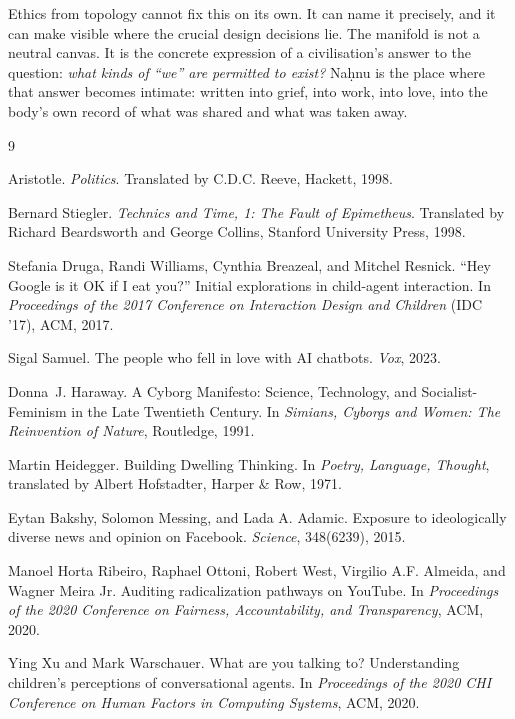 \documentclass[12pt,a4paper]{article}
\begin{document}
Ethics from topology cannot fix this on its own. It can name it precisely, and it can make visible where the crucial design decisions lie. The manifold is not a neutral canvas. It is the concrete expression of a civilisation's answer to the question: \emph{what kinds of ``we'' are permitted to exist?} Na\d{h}nu is the place where that answer becomes intimate: written into grief, into work, into love, into the body's own record of what was shared and what was taken away.


\begin{thebibliography}{9}

Aristotle.
\newblock \emph{Politics}.
\newblock Translated by C.D.C. Reeve, Hackett, 1998.

Bernard Stiegler.
\newblock \emph{Technics and Time, 1: The Fault of Epimetheus}.
\newblock Translated by Richard Beardsworth and George Collins, Stanford University Press, 1998.

Stefania Druga, Randi Williams, Cynthia Breazeal, and Mitchel Resnick.
\newblock ``Hey Google is it OK if I eat you?'' Initial explorations in child-agent interaction.
\newblock In \emph{Proceedings of the 2017 Conference on Interaction Design and Children} (IDC '17), ACM, 2017.

Sigal Samuel.
\newblock The people who fell in love with AI chatbots.
\newblock \emph{Vox}, 2023.

Donna~J. Haraway.
\newblock A Cyborg Manifesto: Science, Technology, and Socialist-Feminism in the Late Twentieth Century.
\newblock In \emph{Simians, Cyborgs and Women: The Reinvention of Nature}, Routledge, 1991.

Martin Heidegger.
\newblock Building Dwelling Thinking.
\newblock In \emph{Poetry, Language, Thought}, translated by Albert Hofstadter, Harper \& Row, 1971.

Eytan Bakshy, Solomon Messing, and Lada A. Adamic.
\newblock Exposure to ideologically diverse news and opinion on Facebook.
\newblock \emph{Science}, 348(6239), 2015.

Manoel Horta Ribeiro, Raphael Ottoni, Robert West, Virgilio A.F. Almeida, and Wagner Meira Jr.
\newblock Auditing radicalization pathways on YouTube.
\newblock In \emph{Proceedings of the 2020 Conference on Fairness, Accountability, and Transparency}, ACM, 2020.

Ying Xu and Mark Warschauer.
\newblock What are you talking to? Understanding children's perceptions of conversational agents.
\newblock In \emph{Proceedings of the 2020 CHI Conference on Human Factors in Computing Systems}, ACM, 2020.

\end{thebibliography}
\end{document}
